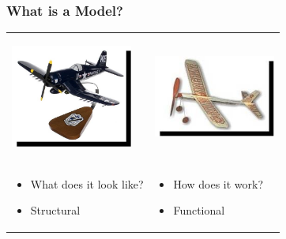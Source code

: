 \documentclass[mathserif,compress]{beamer}\usepackage{graphicx, color}
\def\bit{\begin{itemize}}
\def\eit{\end{itemize}}
\begin{document}

\begin{frame} 
\frametitle{What is a Model?}
     
	\begin{tabular} {p{4.5cm} p{4.5cm}}
		
		\begin{center}
			\includegraphics[width=4.0cm]{figure/airplane1.jpg} 
		\end{center} &
		\begin{center}
			\includegraphics[width=4.0cm]{figure/airplane2.jpg} 
		\end{center} \\

	\bit
		\item{{\color{green!70!black}What does it look like?}} 
		\item{{\color{green!70!black}Structural}} 
	\eit &
	\bit
		\item{{\color{blue!70!black}How does it work?}}
		\item{{\color{blue!70!black}Functional}}
	\eit

	\end{tabular}

\end{frame}

\end{document}
